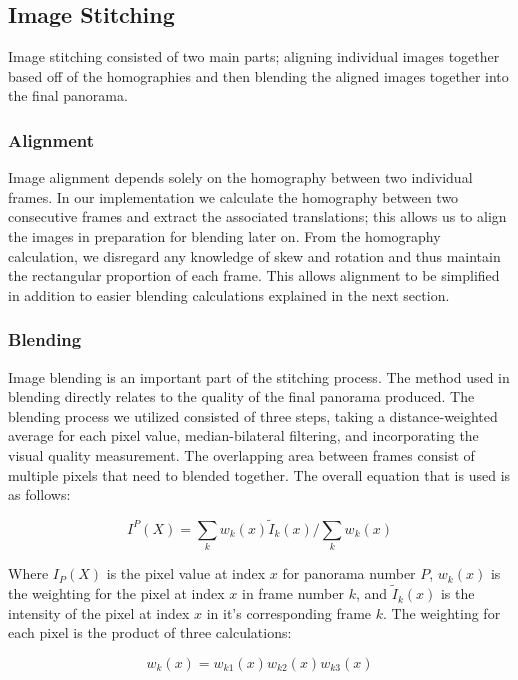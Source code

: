 \subsection{Image Stitching}
Image stitching consisted of two main parts; aligning individual images together based off of the homographies 
and then blending the aligned images together into the final panorama. 

\subsubsection{Alignment}
Image alignment depends solely on the homography between two individual frames. In our implementation we 
calculate the homography between two consecutive frames and extract the associated translations; this allows
us to align the images in preparation for blending later on. From the homography calculation, we disregard
any knowledge of skew and rotation and thus maintain the rectangular proportion of each frame. This allows 
alignment to be simplified in addition to easier blending calculations explained in the next section.

\subsubsection{Blending}
Image blending is an important part of the stitching process. The method used in blending directly relates to
the quality of the final panorama produced. The blending process we utilized consisted of three steps, taking
a distance-weighted average for each pixel value, median-bilateral filtering, and incorporating the visual 
quality measurement. The overlapping area between frames consist of multiple pixels that need to blended 
together. The overall equation that is used is as follows:

\begin{equation}
I^P(X)=\displaystyle\sum_{k} w_k(x)\tilde{I}_k(x)/\displaystyle\sum_{k} w_k(x)
\end{equation}

Where $I_P(X)$ is the pixel value at index $x$ for panorama number $P$, $w_k(x)$ is the weighting for the 
pixel at index $x$ in frame number $k$, and $\tilde{I}_k(x)$ is the intensity of the pixel at index $x$ in 
it's corresponding frame $k$. The weighting for each pixel is the product of three calculations:

\begin{equation}
w_k(x) = w_{k1}(x)w_{k2}(x)w_{k3}(x)
\end{equation}

